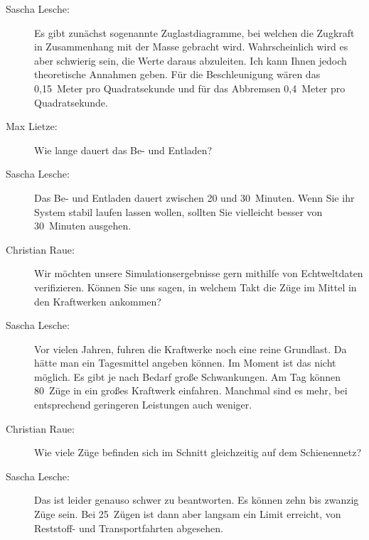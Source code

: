 \begin{description}
    \item[Sascha Lesche:] Es gibt zunächst sogenannte Zuglastdiagramme, bei welchen die Zugkraft in Zusammenhang mit der Masse gebracht wird. Wahrscheinlich wird es aber schwierig sein, die Werte daraus abzuleiten. Ich kann Ihnen jedoch theoretische Annahmen geben. Für die Beschleunigung wären das 0,15~Meter pro Quadratsekunde und für das Abbremsen 0,4~Meter pro Quadratsekunde.

    \item[Max Lietze:] Wie lange dauert das Be- und Entladen?

    \item[Sascha Lesche:] Das Be- und Entladen dauert zwischen 20 und 30~Minuten. Wenn Sie ihr System stabil laufen lassen wollen, sollten Sie vielleicht besser von 30~Minuten ausgehen.

    \item[Christian Raue:] Wir möchten unsere Simulationsergebnisse gern mithilfe von Echtweltdaten verifizieren. Können Sie uns sagen, in welchem Takt die Züge im Mittel in den Kraftwerken ankommen?

    \item[Sascha Lesche:] Vor vielen Jahren, fuhren die Kraftwerke noch eine reine Grundlast. Da hätte man ein Tagesmittel angeben können. Im Moment ist das nicht möglich. Es gibt je nach Bedarf große Schwankungen. Am Tag können 80~Züge in ein großes Kraftwerk einfahren. Manchmal sind es mehr, bei entsprechend geringeren Leistungen auch weniger.

    \item[Christian Raue:] Wie viele Züge befinden sich im Schnitt gleichzeitig auf dem Schienennetz?

    \item[Sascha Lesche:] Das ist leider genauso schwer zu beantworten. Es können zehn bis zwanzig Züge sein. Bei 25~Zügen ist dann aber langsam ein Limit erreicht, von Reststoff- und Transportfahrten abgesehen.

\end{description}